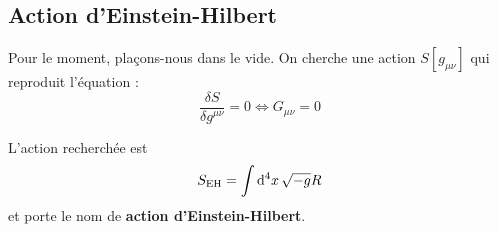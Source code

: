 \subsection{Action d'Einstein-Hilbert}
Pour le moment, plaçons-nous dans le vide. On cherche une action $S[g_{\mu \nu}]$ qui reproduit l'équation :
\begin{equation}
    \label{eq:action einstein vide}
    \frac{\delta S}{\delta g^{\mu \nu}} = 0 \iff G_{\mu \nu} = 0
\end{equation}
\begin{theoremframe}
    \begin{theorem}
        L'action recherchée est
        \begin{equation}
            S_{\text{EH}} = \int \mathrm{d} ^4x \, \sqrt{-g}R
        \end{equation}
        et porte le nom de \textbf{action d'Einstein-Hilbert}. 
    \end{theorem}
\end{theoremframe}


